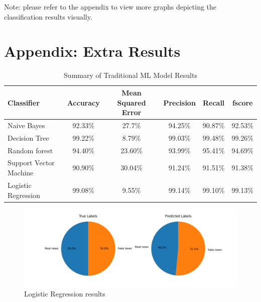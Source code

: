 \documentclass[10pt,twocolumn,letterpaper]{article}
\begin{document}
Note: please refer to the appendix to view more graphs depicting the classification results visually.

{\small
\raggedright


}

\newpage
\appendix
\onecolumn
\section*{Appendix: Extra Results}\centering
\begin{table}[!hb]\centering
   \begin{center}
   \begin{tabular}{|l|c|c|c|c|c|}
   \hline
    Classifier & Accuracy & Mean Squared Error & Precision & Recall & fscore\\
   \hline\hline
   Naive Bayes & 92.33\% & 27.7\% & 94.25\% & 90.87\% & 92.53\% \\
   Decision Tree & 99.22\% & 8.79\% & 99.03\% & 99.48\% & 99.26\% \\
   Random forest & 94.40\% & 23.60\% & 93.99\% & 95.41\% & 94.69\%\\
   Support Vector Machine & 90.90\% & 30.04\% & 91.24\% & 91.51\% & 91.38\% \\
   Logistic Regression & 99.08\% & 9.55\% & 99.14\% & 99.10\% & 99.13\% \\
   \hline
   \end{tabular}
   \end{center}
   \caption{Summary of Traditional ML Model Results\label{first_table}}
\end{table}

\begin{figure}[h]
   \begin{center}
        \includegraphics[scale=0.6]{graphs/LR/piechart.png}
   \end{center}
\vspace*{-5mm}
\caption{Logistic Regression results \label{piechart_1}}
\end{figure}
\end{document}
